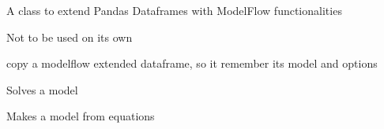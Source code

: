 \documentclass[letterpaper,10pt,english]{sphinxmanual}
\begin{document}
\begin{fulllineitems}
\label{\detokenize{index:modelmf.mf}}
\pysigstartsignatures
{}
\pysigstopsignatures
\sphinxAtStartPar
A class to extend Pandas Dataframes with ModelFlow functionalities

\sphinxAtStartPar
Not to be used on its own

\begin{fulllineitems}
\label{\detokenize{index:modelmf.mf.copy}}
\pysigstartsignatures
{}
\pysigstopsignatures
\sphinxAtStartPar
copy a modelflow extended dataframe, so it remember its model and options

\end{fulllineitems}


\begin{fulllineitems}
\label{\detokenize{index:modelmf.mf.solve}}
\pysigstartsignatures
{}
\pysigstopsignatures
\sphinxAtStartPar
Solves a model

\end{fulllineitems}


\begin{fulllineitems}
\label{\detokenize{index:modelmf.mf.makemodel}}
\pysigstartsignatures
{}
\pysigstopsignatures
\sphinxAtStartPar
Makes a model from equations

\end{fulllineitems}



\end{fulllineitems}
\end{document}

